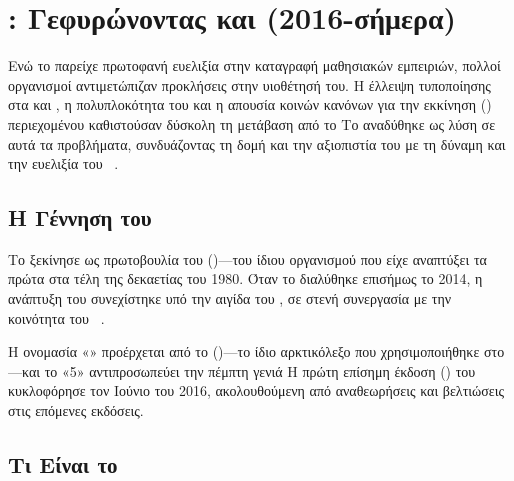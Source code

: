 \section{: Γεφυρώνοντας  και  (2016-σήμερα)}
\label{sec:cmi5}

Ενώ το  παρείχε πρωτοφανή ευελιξία στην καταγραφή μαθησιακών εμπειριών, πολλοί οργανισμοί αντιμετώπιζαν προκλήσεις στην υιοθέτησή του. Η έλλειψη τυποποίησης στα  και , η πολυπλοκότητα του   και η απουσία κοινών κανόνων για την εκκίνηση (\textit{}) περιεχομένου καθιστούσαν δύσκολη τη μετάβαση από το  Το  αναδύθηκε ως λύση σε αυτά τα προβλήματα, συνδυάζοντας τη δομή και την αξιοπιστία του  με τη δύναμη και την ευελιξία του ~\cite{xapicom2024cmi5overview,aicc2022cmi5}.

\subsection{Η Γέννηση του }
\label{subsec:cmi5_genesis}

Το  ξεκίνησε ως πρωτοβουλία του \textit{    } ()—του ίδιου οργανισμού που είχε αναπτύξει τα πρώτα   στα τέλη της δεκαετίας του 1980. Όταν το  διαλύθηκε επισήμως το 2014, η ανάπτυξη του  συνεχίστηκε υπό την αιγίδα του , σε στενή συνεργασία με την κοινότητα του ~\cite{adl2019cmi5,xapicom2024cmi5}.

Η ονομασία «» προέρχεται από το \textit{  } ()—το ίδιο αρκτικόλεξο που χρησιμοποιήθηκε στο  —και το «5» αντιπροσωπεύει την πέμπτη γενιά   Η πρώτη επίσημη έκδοση () του  κυκλοφόρησε τον Ιούνιο του 2016, ακολουθούμενη από αναθεωρήσεις και βελτιώσεις στις επόμενες εκδόσεις.

\subsection{Τι Είναι το }
\label{subsec:cmi5_definition}

